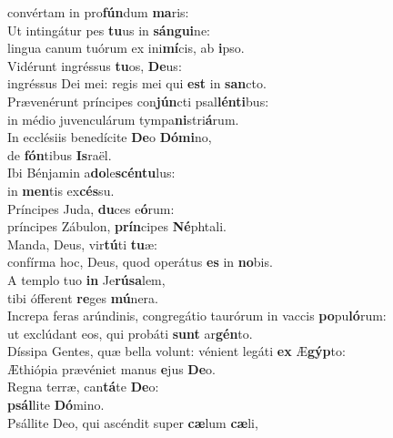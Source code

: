 \evenverse convértam in pro\textbf{fún}dum \textbf{ma}ris:\\
\oddverse Ut intingátur pes \textbf{tu}us in \textbf{sán}\textbf{gui}ne:~\*\\
\oddverse lingua canum tuórum ex ini\textbf{mí}cis, ab \textbf{i}pso.\\
\evenverse Vidérunt ingréssus \textbf{tu}os, \textbf{De}us:~\*\\
\evenverse ingréssus Dei mei: regis mei qui \textbf{est} in \textbf{san}cto.\\
\oddverse Prævenérunt príncipes con\textbf{jún}cti psal\textbf{lén}\textbf{ti}bus:~\*\\
\oddverse in médio juvenculárum tympa\textbf{ni}stri\textbf{á}rum.\\
\evenverse In ecclésiis benedícite \textbf{De}o \textbf{Dó}\textbf{mi}no,~\*\\
\evenverse de \textbf{fón}tibus \textbf{Is}raël.\\
\oddverse Ibi Bénjamin a\textbf{do}le\textbf{scén}\textbf{tu}lus:~\*\\
\oddverse in \textbf{men}tis ex\textbf{cés}su.\\
\evenverse Príncipes Juda, \textbf{du}ces e\textbf{ó}rum:~\*\\
\evenverse príncipes Zábulon, \textbf{prín}cipes \textbf{Né}phtali.\\
\oddverse Manda, Deus, vir\textbf{tú}ti \textbf{tu}æ:~\*\\
\oddverse confírma hoc, Deus, quod operátus \textbf{es} in \textbf{no}bis.\\
\evenverse A templo tuo \textbf{in} Je\textbf{rú}\textbf{sa}lem,~\*\\
\evenverse tibi ófferent \textbf{re}ges \textbf{mú}nera.\\
\oddverse Increpa feras arúndinis, congregátio taurórum in vaccis \textbf{po}pu\textbf{ló}rum:~\*\\
\oddverse ut exclúdant eos, qui probáti \textbf{sunt} ar\textbf{gén}to.\\
\evenverse Díssipa Gentes, quæ bella volunt: vénient legáti \textbf{ex} Æ\textbf{gýp}to:~\*\\
\evenverse Æthiópia prævéniet manus \textbf{e}jus \textbf{De}o.\\
\oddverse Regna terræ, can\textbf{tá}te \textbf{De}o:~\*\\
\oddverse \textbf{psál}lite \textbf{Dó}mino.\\
\evenverse Psállite Deo, qui ascéndit super \textbf{cæ}lum \textbf{cæ}li,~\*\\

